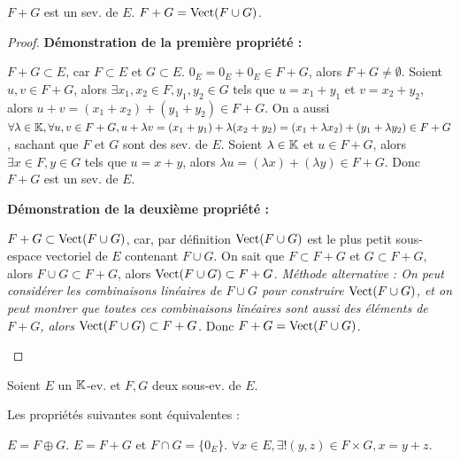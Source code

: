 \documentclass[12pt,a4paper]{report}
\begin{document}
\begin{property}
    \begin{outline}
    \1 $F+G$ est un sev. de $E$.
    \1 $F+G = \mathrm{Vect}(F \cup G)$.
    \end{outline}
\end{property}

\begin{proof}
    \textbf{Démonstration de la première propriété :}

    \begin{outline}
        \1 $F+G \subset E$, car $F \subset E$ et $G \subset E$.
        \1 $0_E = 0_E + 0_E \in F+G$, alors $F+G \ne \emptyset$.
        \1 Soient $u,v \in F+G$, alors $\exists x_1,x_2 \in F, y_1,y_2 \in G$ tels que $u = x_1 + y_1$ et $v = x_2 + y_2$, alors $u+v = (x_1+x_2) + (y_1+y_2) \in F+G$.
        \1 On a aussi $\forall \lambda \in \mathbb{K}, \forall u,v \in F+G, u + \lambda v = (x_1 + y_1) + \lambda (x_2 + y_2) = (x_1 + \lambda x_2) + (y_1 + \lambda y_2) \in F+G$, sachant que $F$ et $G$ sont des sev. de $E$.
        \1 Soient $\lambda \in \mathbb{K}$ et $u \in F+G$, alors $\exists x \in F, y \in G$ tels que $u = x+y$, alors $\lambda u = (\lambda x) + (\lambda y) \in F+G$.
        \1 Donc $F+G$ est un sev. de $E$.
    \end{outline}

    \textbf{Démonstration de la deuxième propriété :}

    \begin{outline}
        \1 $F+G \subset \mathrm{Vect}(F \cup G)$, car, par définition $\mathrm{Vect}(F \cup G)$ est le plus petit sous-espace vectoriel de $E$ contenant $F \cup G$.
        \1 On sait que $F \subset F+G$ et $G \subset F+G$, alors $F \cup G \subset F+G$, alors $\mathrm{Vect}(F \cup G) \subset F+G$.
        \1 \textit{Méthode alternative : On peut considérer les combinaisons linéaires de $F \cup G$ pour construire $\mathrm{Vect}(F \cup G)$, et on peut montrer que toutes ces combinaisons linéaires sont aussi des éléments de $F+G$, alors $\mathrm{Vect}(F \cup G) \subset F+G$.}
        \1 Donc $F+G = \mathrm{Vect}(F \cup G)$.
    \end{outline}
\end{proof}

\begin{property}
    Soient $E$ un $\mathbb{K}$-ev. et $F,G$ deux sous-ev. de $E$.

    Les propriétés suivantes sont équivalentes :

    \begin{outline}
        \1 $E = F \oplus G$.
        \1 $E = F + G$ et $F \cap G = \{0_E\}$.
        \1 $\forall x \in E, \exists ! (y,z) \in F\times G, x = y+z$.
    \end{outline}
\end{property}
\end{document}
